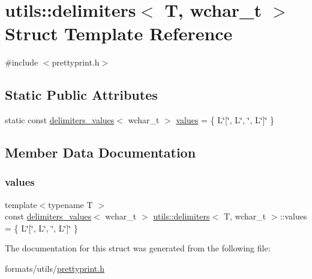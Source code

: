 \hypertarget{structutils_1_1delimiters_3_01_t_00_01wchar__t_01_4}{}\section{utils\+::delimiters$<$ T, wchar\+\_\+t $>$ Struct Template Reference}
\label{structutils_1_1delimiters_3_01_t_00_01wchar__t_01_4}


{\ttfamily \#include $<$prettyprint.\+h$>$}

\subsection*{Static Public Attributes}
\begin{DoxyCompactItemize}
\item 
static const \mbox{\hyperlink{structutils_1_1delimiters__values}{delimiters\+\_\+values}}$<$ wchar\+\_\+t $>$ \mbox{\hyperlink{structutils_1_1delimiters_3_01_t_00_01wchar__t_01_4_ad187dc820b1344596da08dcd240f720a}{values}} = \{ L\char`\"{}\mbox{[}\char`\"{}, L\char`\"{}, \char`\"{}, L\char`\"{}\mbox{]}\char`\"{} \}
\end{DoxyCompactItemize}


\subsection{Member Data Documentation}
\mbox{\label{structutils_1_1delimiters_3_01_t_00_01wchar__t_01_4_ad187dc820b1344596da08dcd240f720a}} 
\subsubsection{\texorpdfstring{values}{values}}
{\footnotesize\ttfamily template$<$typename T $>$ \\
const \mbox{\hyperlink{structutils_1_1delimiters__values}{delimiters\+\_\+values}}$<$ wchar\+\_\+t $>$ \mbox{\hyperlink{structutils_1_1delimiters}{utils\+::delimiters}}$<$ T, wchar\+\_\+t $>$\+::values = \{ L\char`\"{}\mbox{[}\char`\"{}, L\char`\"{}, \char`\"{}, L\char`\"{}\mbox{]}\char`\"{} \}\hspace{0.3cm}{\ttfamily [static]}}



The documentation for this struct was generated from the following file\+:\begin{DoxyCompactItemize}
\item 
formats/utils/\mbox{\hyperlink{prettyprint_8h}{prettyprint.\+h}}\end{DoxyCompactItemize}
